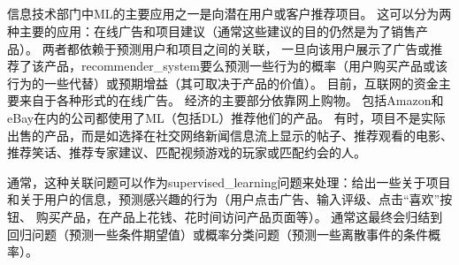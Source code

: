 \subsection{}
\label{sec:recommender_systems}
信息技术部门中\gls{ML}的主要应用之一是向潜在用户或客户推荐项目。
这可以分为两种主要的应用：在线广告和项目建议（通常这些建议的目的仍然是为了销售产品）。
两者都依赖于预测用户和项目之间的关联， 一旦向该用户展示了广告或推荐了该产品，\gls{recommender_system}要么预测一些行为的概率（用户购买产品或该行为的一些代替）或预期增益（其可取决于产品的价值）。
目前，互联网的资金主要来自于各种形式的在线广告。
经济的主要部分依靠网上购物。 
包括Amazon和eBay在内的公司都使用了\gls{ML}（包括\gls{DL}）推荐他们的产品。
有时，项目不是实际出售的产品，而是如选择在社交网络新闻信息流上显示的帖子、推荐观看的电影、推荐笑话、推荐专家建议、匹配视频游戏的玩家或匹配约会的人。

通常，这种关联问题可以作为\gls{supervised_learning}问题来处理：给出一些关于项目和关于用户的信息，预测感兴趣的行为（用户点击广告、输入评级、点击``喜欢''按钮、 购买产品，在产品上花钱、花时间访问产品页面等）。
通常这最终会归结到回归问题（预测一些条件期望值）或概率分类问题（预测一些离散事件的条件概率）。

